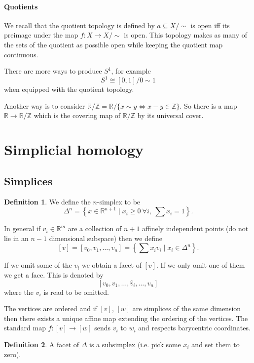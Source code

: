 \documentclass[12pt]{article}
\theoremstyle{definition}
\theoremstyle{definition}
\newtheorem*{defn}{Definition}
\newcommand{\ZZ}{\mathbb{Z}}
\newcommand{\RR}{\mathbb{R}}
\begin{document}
\paragraph{Quotients}
We recall that the quotient topology is defined by $a \subseteq X/\sim$ is open iff its preimage under the map $f\colon X \to X/\sim$ is open.
This topology makes as many of the sets of the quotient as possible open while keeping the quotient map continuous.

There are more ways to produce $S^1$, for example
\[S^1 \cong [0,1]/0\sim1\]
when equipped with the quotient topology.

Another way is to consider $\RR/\ZZ = \RR/\{x\sim y \iff x-y\in \ZZ\}$.
So there is a map $\RR \to \RR/\ZZ$ which is the covering map of $\RR/\ZZ$ by its universal cover.

\section{Simplicial homology}
\subsection{Simplices}
\begin{defn}
We define the $n$-simplex to be
\[\Delta^n = \left\{x\in \RR^{n+1} \mid x_i \ge 0\ \forall i,\ \sum x_i = 1\right\}.\]
\end{defn}


In general if $v_i\in \RR^m$ are a collection of $n+1$ affinely independent points (do not lie in an $n-1$ dimensional subspace) then we define
\[[v] = [v_0,v_1,\ldots,v_n] = \left\{\sum x_i v_i \mid x_i\in \Delta^n\right\}.\]


If we omit some of the $v_i$ we obtain a facet of $[v]$.
If we only omit one of them we get a face.
This is denoted by
\[[v_0,v_1, \ldots, \hat v_i, \ldots , v_n]\]
where the $v_i$ is read to be omitted.

The vertices are ordered and if $[v]$, $[w]$ are simplices of the same dimension then there exists a unique affine map extending the ordering of the vertices.
The standard map $f\colon [v]\to [w]$ sends $v_i$ to $w_i$ and respects barycentric coordinates. 


\begin{defn}
A facet of $\Delta$ is a subsimplex (i.e. pick some $x_i$ and set them to zero).
\end{defn}
\end{document}
